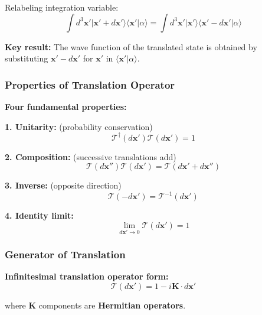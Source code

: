\documentclass[11pt,a4paper]{article}
\begin{document}
Relabeling integration variable:
\begin{equation}
\int d^3\mathbf{x}'|\mathbf{x}' + d\mathbf{x}'\rangle\langle\mathbf{x}'|\alpha\rangle = \int d^3\mathbf{x}'|\mathbf{x}'\rangle\langle\mathbf{x}' - d\mathbf{x}'|\alpha\rangle
\tag{1.196}
\end{equation}

\textbf{Key result:} The wave function of the translated state is obtained by substituting $\mathbf{x}' - d\mathbf{x}'$ for $\mathbf{x}'$ in $\langle\mathbf{x}'|\alpha\rangle$.

\subsubsection{Properties of Translation Operator}

\textbf{Four fundamental properties:}

\textbf{1. Unitarity:} (probability conservation)
\begin{equation}
\mathcal{T}^\dagger(d\mathbf{x}')\mathcal{T}(d\mathbf{x}') = 1
\tag{1.198}
\end{equation}

\textbf{2. Composition:} (successive translations add)
\begin{equation}
\mathcal{T}(d\mathbf{x}'')\mathcal{T}(d\mathbf{x}') = \mathcal{T}(d\mathbf{x}' + d\mathbf{x}'')
\tag{1.199}
\end{equation}

\textbf{3. Inverse:} (opposite direction)
\begin{equation}
\mathcal{T}(-d\mathbf{x}') = \mathcal{T}^{-1}(d\mathbf{x}')
\tag{1.200}
\end{equation}

\textbf{4. Identity limit:}
\begin{equation}
\lim_{d\mathbf{x}' \to 0}\mathcal{T}(d\mathbf{x}') = 1
\tag{1.201}
\end{equation}

\subsubsection{Generator of Translation}

\textbf{Infinitesimal translation operator form:}
\begin{equation}
\boxed{\mathcal{T}(d\mathbf{x}') = 1 - i\mathbf{K} \cdot d\mathbf{x}'}
\tag{1.202}
\end{equation}

where $\mathbf{K}$ components are \textbf{Hermitian operators}.
\end{document}
